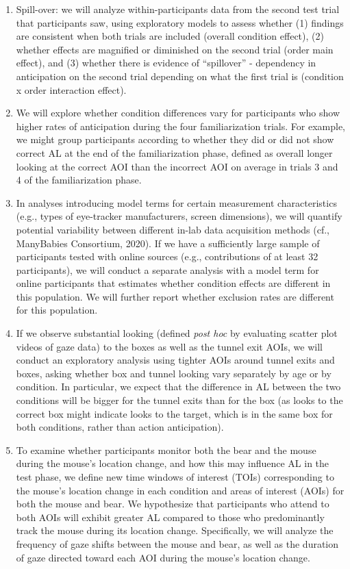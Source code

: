 \documentclass[
  english,
  man,floatsintext]{apa6}
\begin{document}
\begin{enumerate}
\def\labelenumi{\arabic{enumi}.}
\item
  Spill-over: we will analyze within-participants data from the second test trial that participants saw, using exploratory models to assess whether (1) findings are consistent when both trials are included (overall condition effect), (2) whether effects are magnified or diminished on the second trial (order main effect), and (3) whether there is evidence of ``spillover'' - dependency in anticipation on the second trial depending on what the first trial is (condition x order interaction effect).
\item
  We will explore whether condition differences vary for participants who show higher rates of anticipation during the four familiarization trials. For example, we might group participants according to whether they did or did not show correct AL at the end of the familiarization phase, defined as overall longer looking at the correct AOI than the incorrect AOI on average in trials 3 and 4 of the familiarization phase.
\item
  In analyses introducing model terms for certain measurement characteristics (e.g., types of eye-tracker manufacturers, screen dimensions), we will quantify potential variability between different in-lab data acquisition methods (cf., ManyBabies Consortium, 2020). If we have a sufficiently large sample of participants tested with online sources (e.g., contributions of at least 32 participants), we will conduct a separate analysis with a model term for online participants that estimates whether condition effects are different in this population. We will further report whether exclusion rates are different for this population.
\item
  If we observe substantial looking (defined \emph{post hoc} by evaluating scatter plot videos of gaze data) to the boxes as well as the tunnel exit AOIs, we will conduct an exploratory analysis using tighter AOIs around tunnel exits and boxes, asking whether box and tunnel looking vary separately by age or by condition. In particular, we expect that the difference in AL between the two conditions will be bigger for the tunnel exits than for the box (as looks to the correct box might indicate looks to the target, which is in the same box for both conditions, rather than action anticipation).
\item
  To examine whether participants monitor both the bear and the mouse during the mouse's location change, and how this may influence AL in the test phase, we define new time windows of interest (TOIs) corresponding to the mouse's location change in each condition and areas of interest (AOIs) for both the mouse and bear. We hypothesize that participants who attend to both AOIs will exhibit greater AL compared to those who predominantly track the mouse during its location change. Specifically, we will analyze the frequency of gaze shifts between the mouse and bear, as well as the duration of gaze directed toward each AOI during the mouse's location change.
\end{enumerate}
\end{document}

